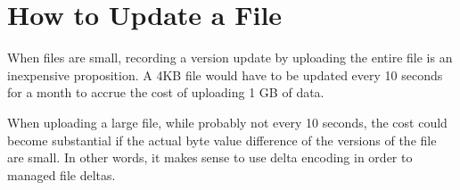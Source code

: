 \section{How to Update a File}

When files are small, recording a version update by uploading the
entire file is an inexpensive proposition. A 4KB file would have to be
updated every 10 seconds for a month to accrue the cost of uploading 1
GB of data.

When uploading a large file, while probably not every 10 seconds, the
cost could become substantial if the actual byte value difference of
the versions of the file are small. In other words, it makes sense to
use delta encoding in order to managed file deltas.



